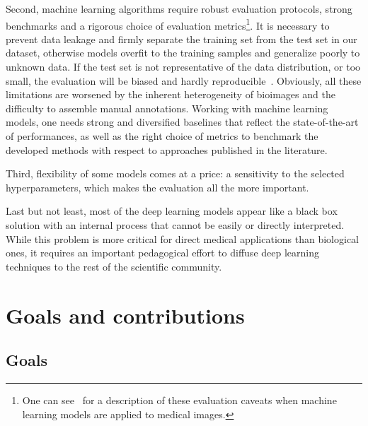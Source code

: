 Second, machine learning algorithms require robust evaluation protocols, strong benchmarks and a rigorous choice of evaluation metrics\footnote{One can see~\cite{varoquaux_machine_2022} for a description of these evaluation caveats when machine learning models are applied to medical images.}.
It is necessary to prevent data leakage and firmly separate the training set from the test set in our dataset, otherwise models overfit to the training samples and generalize poorly to unknown data.
If the test set is not representative of the data distribution, or too small, the evaluation will be biased and hardly reproducible~\cite{Varoquaux_cv_2018}.
Obviously, all these limitations are worsened by the inherent heterogeneity of bioimages and the difficulty to assemble manual annotations.
Working with machine learning models, one needs strong and diversified baselines that reflect the state-of-the-art of performances, as well as the right choice of metrics to benchmark the developed methods with respect to approaches published in the literature.

Third, flexibility of some models comes at a price: a sensitivity to the selected hyperparameters, which makes the evaluation all the more important.

Last but not least, most of the deep learning models appear like a black box solution with an internal process that cannot be easily or directly interpreted.
While this problem is more critical for direct medical applications than biological ones, it requires an important pedagogical effort to diffuse deep learning techniques to the rest of the scientific community.

\section{Goals and contributions}
\label{sec:contributions}

\subsection{Goals}
\label{subsec:intro_goals}

